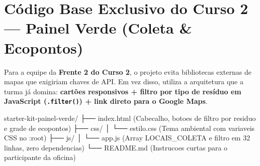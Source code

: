 \section{Código Base Exclusivo do Curso 2 — Painel Verde (Coleta \& Ecopontos)}\label{sec:curso2}

Para a equipe da \textbf{Frente 2 do Curso 2}, o projeto evita bibliotecas externas de mapas que exigiriam chaves de API. Em vez disso, utiliza a arquitetura que a turma já domina: \textbf{cartões responsivos + filtro por tipo de resíduo em JavaScript (\texttt{.filter()}) + link direto para o Google Maps}.


\begin{arvore}
starter-kit-painel-verde/
├── index.html          (Cabecalho, botoes de filtro por residuo e grade de ecopontos)
├── css/
│   └── estilo.css      (Tema ambiental com variaveis CSS no :root)
├── js/
│   └── app.js          (Array LOCAIS_COLETA e filtro em 32 linhas, zero dependencias)
└── README.md           (Instrucoes curtas para o participante da oficina)
\end{arvore}



